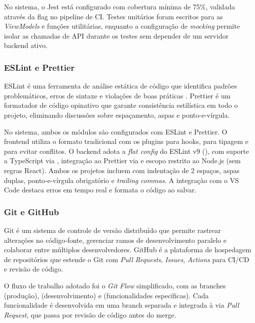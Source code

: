 No sistema, o Jest está configurado com cobertura mínima de 75\%, validada através da flag  no pipeline de CI. Testes unitários foram escritos para as \textit{ViewModels} e funções utilitárias, enquanto a configuração de \textit{mocking} permite isolar as chamadas de API durante os testes sem depender de um servidor backend ativo.

\subsubsection{ESLint e Prettier}
ESLint é uma ferramenta de análise estática de código que identifica padrões problemáticos, erros de sintaxe e violações de boas práticas \cite{eslint2025}. Prettier \cite{prettier2025} é um formatador de código opinativo que garante consistência estilística em todo o projeto, eliminando discussões sobre espaçamento, aspas e ponto-e-vírgula.

No sistema, ambos os módulos são configurados com ESLint e Prettier. O frontend utiliza o formato  tradicional com os plugins  para hooks,  para tipagem e  para evitar conflitos. O backend adota a \textit{flat config} do ESLint v9 (), com suporte a TypeScript via , integração ao Prettier via  e escopo restrito ao Node.js (sem regras React). Ambos os projetos incluem  com indentação de 2 espaços, aspas duplas, ponto-e-vírgula obrigatório e \textit{trailing commas}. A integração com o VS Code destaca erros em tempo real e formata o código ao salvar.

\subsubsection{Git e GitHub}
Git \cite{git2025} é um sistema de controle de versão distribuído que permite rastrear alterações no código-fonte, gerenciar ramos de desenvolvimento paralelo e colaborar entre múltiplos desenvolvedores. GitHub \cite{github2025} é a plataforma de hospedagem de repositórios que estende o Git com \textit{Pull Requests}, \textit{Issues}, \textit{Actions} para CI/CD e revisão de código.

O fluxo de trabalho adotado foi o \textit{Git Flow} simplificado, com as branches  (produção),  (desenvolvimento) e  (funcionalidades específicas). Cada funcionalidade é desenvolvida em uma branch separada e integrada à  via \textit{Pull Request}, que passa por revisão de código antes do merge.

